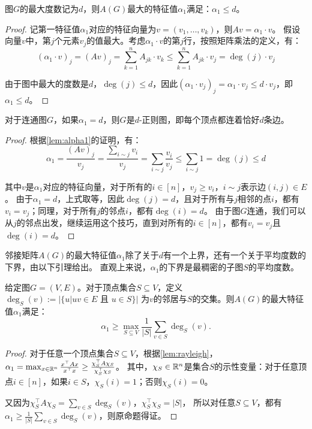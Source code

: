 \begin{lemma}\label{lem:alpha1}
    图$G$的最大度数记为$d$，则$A(G)$最大的特征值$\alpha_1$满足：$\alpha_1\le d$。
\end{lemma}

\begin{proof}
    记第一特征值$\alpha_1$对应的特征向量为$v=(v_1,\dots,v_k)$，则$Av=\alpha_1\cdot v$。
    假设向量$v$中，第$j$个元素$v_j$的值最大。考虑$\alpha_1\cdot v$的第$j$行，按照矩阵乘法的定义，有：
    \[
    (\alpha_1\cdot v)_j=(Av)_j=\sum_{k=1}^n A_{jk}\cdot v_k\le \sum_{k=1}^n A_{jk}\cdot v_j=\deg(j)\cdot v_j
    \]

    由于图中最大的度数是$d$，$\deg(j)\le d$，因此$(\alpha_1\cdot v_j)_j=\alpha_1\cdot v_j\le d\cdot v_j$，即$\alpha_1\le d$。
\end{proof}

\begin{lemma}
    对于连通图$G$，如果$\alpha_1=d$，则$G$是$d$-正则图，即每个顶点都连着恰好$d$条边。
\end{lemma}

\begin{proof}
    根据\cref{lem:alpha1}的证明，有：
    \[
    \alpha_1=\frac{(Av)_j}{v_j}=\frac{\sum_{i\sim j}v_i}{v_j}=\sum_{i\sim j}\frac{v_i}{v_j}
    \le\sum_{i\sim j} 1=\deg(j)\le d
    \]

    其中$v$是$\alpha_1$对应的特征向量，对于所有的$i\in[n]$，$v_j\ge v_i$，$i\sim j$表示边$(i,j)\in E$。
    由于$\alpha_1=d$，上式取等，因此$\deg(j)=d$，且对于所有与$j$相邻的点$i$，都有$v_i=v_j$；同理，对于所有$j$的邻点$i$，都有$\deg(i)=d$。
    由于图$G$连通，我们可以从$j$的邻点出发，继续运用这个技巧，直到对所有的$i\in[n]$，都有$v_i=v_j$且$\deg(i)=d$。
\end{proof}

邻接矩阵$A(G)$的最大特征值$\alpha_1$除了关于$d$有一个上界，还有一个关于平均度数的下界，由以下引理给出。
直观上来说，$\alpha_1$的下界是最稠密的子图$S$的平均度数。

\begin{lemma}
    给定图$G=(V,E)$。对于顶点集合$S\subseteq V$，定义$\deg_S(v):=|\{u|uv\in E\text{ 且 }u\in S\}|$
    为$v$的邻居与$S$的交集。则$A(G)$的最大特征值$\alpha_1$满足：
    \[
    \alpha_1\ge\max_{S\subseteq V}\frac{1}{|S|}\sum_{v\in S}\deg_S(v).
    \]
\end{lemma}

\begin{proof}
    对于任意一个顶点集合$S\subseteq V$，根据\cref{lem:rayleigh}，$\alpha_1=\max_{x\in\mathbb{R}^n}\frac{x^\top Ax}{x^\top x}\ge\frac{\chi_S^\top A\chi_S}{\chi_S^\top \chi_S}$。
    其中，$\chi_S\in\mathbb{R}^n$是集合$S$的示性变量：对于任意顶点$i\in[n]$，如果$i\in S$，$\chi_S(i)=1$；否则$\chi_S(i)=0$。

    又因为$\chi_S^\top A\chi_S=\sum_{v\in S}\deg_S(v)$，$\chi_S^\top \chi_S=|S|$，
    所以对任意$S\subseteq V$，都有$\alpha_1\ge\frac{1}{|S|}\sum_{v\in S}\deg_S(v)$，则原命题得证。
\end{proof}



